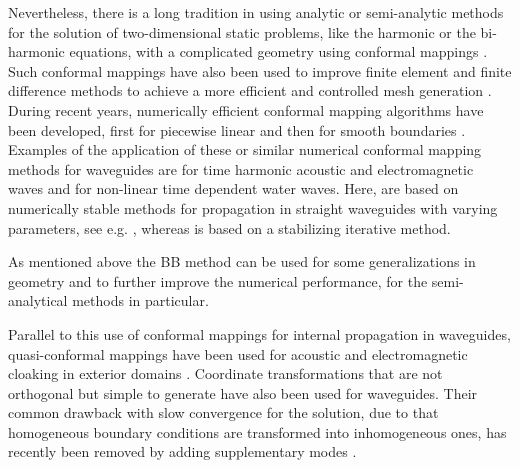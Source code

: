 \documentclass{svjour3}
\begin{document}
Nevertheless, there is a long tradition in using analytic or
semi-analytic methods for the solution of two-dimensional static
problems, like the harmonic or the bi-harmonic equations, with a
complicated geometry using conformal mappings
\cite{muskhelishvili:1962}. Such conformal mappings have also been
used to improve finite element and finite difference methods to
achieve a more efficient and controlled mesh generation
\cite{ives+liutermoza:1977}. During recent years, numerically
efficient conformal mapping algorithms have been developed, first for
piecewise linear \cite{sctoolbox} and then for smooth boundaries
\cite{andersson-outpol:2008,andersson-acf:2009}. Examples of the
application of these or similar numerical conformal mapping methods
for waveguides are \cite{Andersson:2006,Andersson-Nilsson:2009} for
time harmonic acoustic and electromagnetic waves and
\cite{nachbin+daSilvaSimoes:2012} for non-linear time dependent water
waves. Here, \cite{Andersson:2006,Andersson-Nilsson:2009} are based on
numerically stable methods for propagation in straight waveguides with
varying parameters, see e.g. \cite{Fishman:1998,Nilsson:2002}, whereas
\cite{nachbin+daSilvaSimoes:2012} is based on a stabilizing iterative
method.

As mentioned above the BB method can be used for some generalizations
in geometry and to further improve the numerical performance, for the
semi-analytical methods in particular.

Parallel to this use of conformal mappings for internal propagation in
waveguides, quasi-conformal mappings have been used for acoustic and
electromagnetic cloaking in exterior domains
\cite{pendryschurigsmith2006}. Coordinate transformations that are not
orthogonal but simple to generate have also been used for
waveguides. Their common drawback with slow convergence for the
solution, due to that homogeneous boundary conditions are transformed
into inhomogeneous ones, has recently been removed by adding
supplementary modes \cite{maurel+mercier+felix:2014}.
\end{document}
